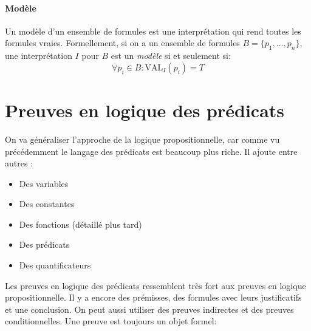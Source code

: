 \subsubsection{Modèle}

Un modèle d'un ensemble de formules est une interprétation qui rend toutes les formules vraies.
Formellement, si on a un ensemble de formules $B = \{ p_1, \ldots, p_n \}$,
une interprétation $I$ pour $B$ est un {\em modèle} si et seulement si:
\begin{equation}
\forall p_i \in B: \mathrm{VAL}_I(p_i) = T
\end{equation}


\chapter{Preuves en logique des prédicats}
\label{preuvemanuelle}

On va généraliser l'approche de la logique propositionnelle, car comme vu précédemment le langage des prédicats est beaucoup plus riche.  Il ajoute entre autres :

\begin{itemize}
    \item Des variables
    \item Des constantes
    \item Des fonctions (détaillé plus tard)
    \item Des prédicats
    \item Des quantificateurs
\end{itemize}

Les preuves en logique des prédicats ressemblent très fort aux preuves en logique propositionnelle. Il y a encore des prémisses, des formules avec leurs justificatifs et une conclusion. On peut aussi utiliser des preuves indirectes et des preuves conditionnelles.
Une preuve est toujours un objet formel:

\begin{center}
\end{center}

